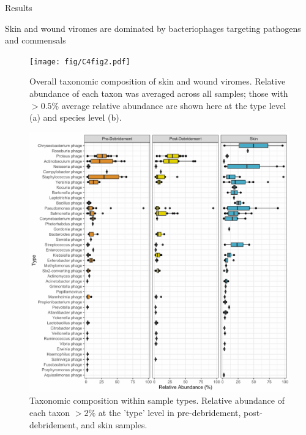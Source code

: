 \documentclass[oneside,12pt,final]{sty/ucthesis-CA2012}
\begin{document}
\begin{mainmatter}
\begin{section}{Results}
\begin{subsection}{Skin and wound viromes are dominated by bacteriophages targeting pathogens and commensals}
\begin{figure}[tp]
\centering
\centerline{\texttt{[image: fig/C4fig2.pdf]}}
\caption{Overall taxonomic composition of skin and wound viromes. Relative abundance of each taxon was averaged across all samples; those with $>0.5\%$ average relative abundance are shown here at the type level (a) and species level (b).}
\label{fig:C4F2}
\end{figure}


\begin{figure}[tp]
\centering
\centerline{\includegraphics[width=\textwidth]{fig/C4fig3.pdf}}
\caption{Taxonomic composition within sample types. Relative abundance of each taxon $>2\%$ at the 'type' level in pre-debridement, post-debridement, and skin samples.}
\label{fig:C4F3}
\end{figure}
 
\end{subsection}


\end{section}
\end{mainmatter}
\end{document}
